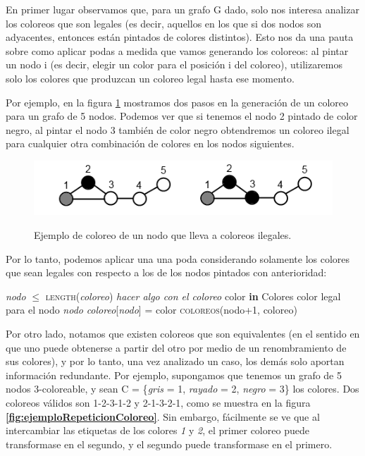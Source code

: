 En primer lugar observamos que, para un grafo G dado, solo nos interesa analizar los coloreos que son legales (es decir, aquellos en los que si dos nodos son adyacentes, entonces est\'an pintados de colores distintos). Esto nos da una pauta sobre como aplicar podas a medida que vamos generando los coloreos: al pintar un nodo i (es decir, elegir un color para el posici\'on i del coloreo), utilizaremos solo los colores que produzcan un coloreo legal hasta ese momento.

Por ejemplo, en la figura \ref{fig:ejemploSoloColoreosNoValidos} mostramos dos pasos en la generaci\'on de un coloreo para un grafo de 5 nodos. Podemos ver que si tenemos el nodo 2 pintado de color negro, al pintar el nodo 3 tambi\'en de color negro obtendremos un coloreo ilegal para cualquier otra combinaci\'on de colores en los nodos siguientes. 

\begin{figure}[H]
	\centering
	\includegraphics[scale=1]{ejemplo-coloreos-no-validos.png}
\label{fig:ejemploSoloColoreosNoValidos}
\caption{Ejemplo de coloreo de un nodo que lleva a coloreos ilegales.}
\end{figure}

Por lo tanto, podemos aplicar una una poda considerando solamente los colores que sean legales con respecto a los de los nodos pintados con anterioridad:

\begin{algorithm}[H]
\caption{} 
\begin{codebox}
\li \If \textit{nodo} $\leq$ \textsc{length}(\textit{coloreo}) \Do
\li 		\textsl{hacer algo con el coloreo}		
		\End
\li	\Else \Do
\li			\For color \textbf{in} Colores \Do
\li		 		\If color legal para el nodo \textsl{nodo}\Do	
\li					\textit{coloreo}[\textit{nodo}] = color
\li					\textsc{coloreos}(nodo+1, coloreo)	
					\End
				\End
		\End
\End
\end{codebox}
\end{algorithm}
 
Por otro lado, notamos que existen coloreos que son equivalentes (en el sentido en que uno puede obtenerse a partir del otro por medio de un renombramiento de sus colores), y por lo tanto, una vez analizado un caso, los dem\'as solo aportan informaci\'on redundante. 
Por ejemplo, supongamos que tenemos un grafo de 5 nodos 3-coloreable, y sean C = \{\textsl{gris} = 1, \textsl{rayado} = 2, \textsl{negro} = 3\} los colores. 
Dos coloreos v\'alidos son 1-2-3-1-2 y 2-1-3-2-1, como se muestra en la figura \textbf{\ref{fig:ejemploRepeticionColoreo}}. 
Sin embargo, f\'acilmente se ve que al intercambiar las etiquetas de los colores \textsl{1} y \textsl{2}, el primer coloreo puede transformase en el segundo, y el segundo puede transformase en el primero. 

